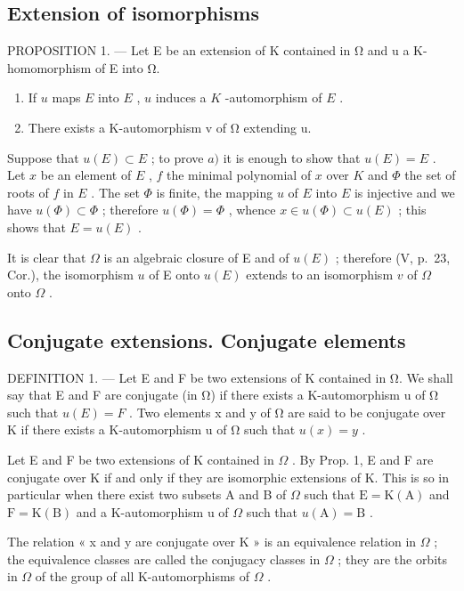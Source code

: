 \subsection{Extension of isomorphisms}

PROPOSITION 1. --- Let E be an extension of K contained in Ω and u a K-homomorphism of E into Ω.

\begin{enumerate}
\def\labelenumi{\alph{enumi})}
\item
  If \(u\) maps \(E\) into \(E\) , \(u\) induces a \(K\) -automorphism of \(E\) .
\item
  There exists a K-automorphism v of Ω extending u.
\end{enumerate}

Suppose that \(u(E) \subset E\) ; to prove \(a)\) it is enough to show that \(u(E) = E\) . Let \(x\) be an element of \(E\) , \(f\) the minimal polynomial of \(x\) over \(K\) and \(\Phi\) the set of roots of \(f\) in \(E\) . The set \(\Phi\) is finite, the mapping \(u\) of \(E\) into \(E\) is injective and we have \(u(\Phi) \subset \Phi\) ; therefore \(u(\Phi) = \Phi\) , whence \(x \in u(\Phi) \subset u(E)\) ; this shows that \(E = u(E)\) .

It is clear that \(\Omega\) is an algebraic closure of E and of \(u(E)\) ; therefore (V, p.~23, Cor.), the isomorphism \(u\) of E onto \(u(E)\) extends to an isomorphism \(v\) of \(\Omega\) onto \(\Omega\) .

\subsection{Conjugate extensions. Conjugate elements}

DEFINITION 1. --- Let E and F be two extensions of K contained in Ω. We shall say that E and F are conjugate (in Ω) if there exists a K-automorphism u of Ω such that \(u(E) = F\) . Two elements x and y of Ω are said to be conjugate over K if there exists a K-automorphism u of Ω such that \(u(x) = y\) .

Let E and F be two extensions of K contained in \(\Omega\) . By Prop. 1, E and F are conjugate over K if and only if they are isomorphic extensions of K. This is so in particular when there exist two subsets A and B of \(\Omega\) such that \(\mathrm{E} = \mathrm{K}(\mathrm{A})\) and \(\mathrm{F} = \mathrm{K}(\mathrm{B})\) and a K-automorphism u of \(\Omega\) such that \(u(\mathrm{A}) = \mathrm{B}\) .

The relation « x and y are conjugate over K » is an equivalence relation in \(\Omega\) ; the equivalence classes are called the conjugacy classes in \(\Omega\) ; they are the orbits in \(\Omega\) of the group of all K-automorphisms of \(\Omega\) .

